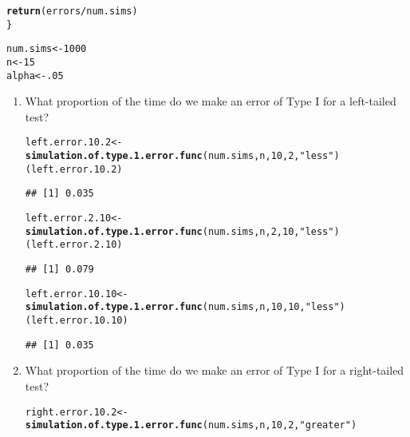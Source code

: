\documentclass{article}\usepackage[]{graphicx}\usepackage[]{xcolor}
\makeatletter
\newcommand{\hlnum}[1]{\textcolor[rgb]{0.686,0.059,0.569}{#1}}%
\newcommand{\hlsng}[1]{\textcolor[rgb]{0.192,0.494,0.8}{#1}}%
\newcommand{\hlopt}[1]{\textcolor[rgb]{0,0,0}{#1}}%
\newcommand{\hldef}[1]{\textcolor[rgb]{0.345,0.345,0.345}{#1}}%
\newcommand{\hlkwb}[1]{\textcolor[rgb]{0.69,0.353,0.396}{#1}}%
\newcommand{\hlkwd}[1]{\textcolor[rgb]{0.737,0.353,0.396}{\textbf{#1}}}%
\newenvironment{kframe}{%
 \def\at@end@of@kframe{}%
 \ifinner\ifhmode%
  \def\at@end@of@kframe{\end{minipage}}%
  \begin{minipage}{\columnwidth}%
 \fi\fi%
 \def\FrameCommand##1{\hskip\@totalleftmargin \hskip-\fboxsep
 \colorbox{shadecolor}{##1}\hskip-\fboxsep
     \hskip-\linewidth \hskip-\@totalleftmargin \hskip\columnwidth}%
 \MakeFramed {\advance\hsize-\width
   \@totalleftmargin\z@ \linewidth\hsize
   \@setminipage}}%
 {\par\unskip\endMakeFramed%
 \at@end@of@kframe}
\newenvironment{knitrout}{}{} %
\makeatother
\begin{document}
\begin{enumerate}
\begin{knitrout}
\begin{kframe}
\begin{alltt}
  \hlkwd{return} \hldef{(errors}\hlopt{/} \hldef{num.sims)}
\hldef{\}}

\hldef{num.sims} \hlkwb{<-} \hlnum{1000}
\hldef{n} \hlkwb{<-} \hlnum{15}
\hldef{alpha} \hlkwb{<-} \hlnum{.05}
\end{alltt}
\end{kframe}
\end{knitrout}
  \begin{enumerate}
    \item What proportion of the time do we make an error of Type I for a
    left-tailed test?
\begin{knitrout}
\color{fgcolor}\begin{kframe}
\begin{alltt}
\hldef{left.error.10.2} \hlkwb{<-} \hlkwd{simulation.of.type.1.error.func}\hldef{(num.sims, n,} \hlnum{10}\hldef{,} \hlnum{2}\hldef{,} \hlsng{"less"}\hldef{)}
  \hldef{(left.error.10.2)}
\end{alltt}
\begin{verbatim}
## [1] 0.035
\end{verbatim}
\begin{alltt}
  \hldef{left.error.2.10} \hlkwb{<-} \hlkwd{simulation.of.type.1.error.func}\hldef{(num.sims,n,} \hlnum{2}\hldef{,}\hlnum{10}\hldef{,} \hlsng{"less"}\hldef{)}
  \hldef{(left.error.2.10)}
\end{alltt}
\begin{verbatim}
## [1] 0.079
\end{verbatim}
\begin{alltt}
  \hldef{left.error.10.10} \hlkwb{<-} \hlkwd{simulation.of.type.1.error.func}\hldef{(num.sims,n,}\hlnum{10}\hldef{,}\hlnum{10}\hldef{,}\hlsng{"less"}\hldef{)}
  \hldef{(left.error.10.10)}
\end{alltt}
\begin{verbatim}
## [1] 0.035
\end{verbatim}
\end{kframe}
\end{knitrout}
    \item What proportion of the time do we make an error of Type I for a
    right-tailed test?
\begin{knitrout}
\color{fgcolor}\begin{kframe}
\begin{alltt}
\hldef{right.error.10.2} \hlkwb{<-} \hlkwd{simulation.of.type.1.error.func}\hldef{(num.sims,n,} \hlnum{10}\hldef{,}\hlnum{2}\hldef{,}\hlsng{"greater"}\hldef{)}

\end{alltt}
\end{kframe}
\end{knitrout}
\end{enumerate}
\end{enumerate}
\end{document}
